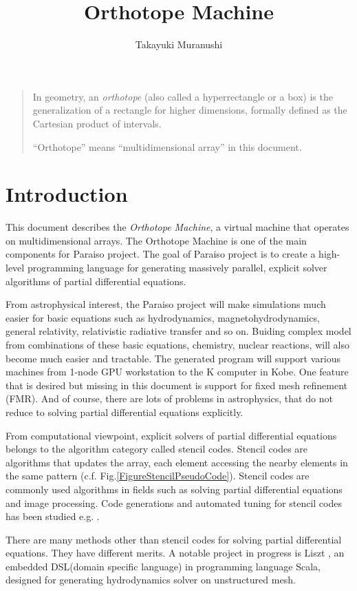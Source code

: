 \documentclass[twocolumn]{article}
\title{Orthotope Machine}
\author{Takayuki Muranushi}
\begin{document}
\maketitle
\begin{quote}
  In geometry, an {\em orthotope} (also called a hyperrectangle or a box) is
  the generalization of a rectangle for higher dimensions, formally
  defined as the Cartesian product of intervals.

  ``Orthotope'' means ``multidimensional array'' in this document.
\end{quote}

\section{Introduction}

This document describes the {\em Orthotope Machine}, a virtual machine that
operates on multidimensional arrays. The Orthotope Machine is one of the main
components for Paraiso project. The goal of Paraiso project is to create a
high-level programming language for generating massively parallel, explicit
solver algorithms of partial differential equations. 

From astrophysical interest, the Paraiso project will make simulations much
easier for basic equations such as hydrodynamics, magnetohydrodynamics,
general relativity, relativistic radiative transfer and so on. Buiding complex
model from combinations of these basic equations, chemistry, nuclear
reactions, will also become much easier and tractable. The generated program
will support various machines from 1-node GPU workstation to the K computer in
Kobe. One feature that is desired but missing in this document is support for
fixed mesh refinement (FMR). And of course, there are lots of problems in
astrophysics, that do not reduce to solving partial differential equations
explicitly.

From computational viewpoint, explicit solvers of partial differential
equations belongs to the algorithm category called stencil codes. Stencil
codes are algorithms that updates the array, each element accessing the nearby
elements in the same pattern (c.f. Fig.\ref{FigureStencilPseudoCode}). Stencil
codes are commonly used algorithms in fields such as solving partial
differential equations and image processing. Code generations and automated
tuning for stencil codes has been studied e.g. \cite{Datta:EECS-2009-177,
  Datta:2008:SCO:1413370.1413375}.

There are many methods other than stencil codes for solving partial
differential equations. They have different merits. A notable project in
progress is Liszt \cite{Chafi:2010:LVH:1932682.1869527}, an embedded
DSL(domain specific language) in programming language Scala, designed for
generating hydrodynamics solver on unstructured mesh.
\end{document}
